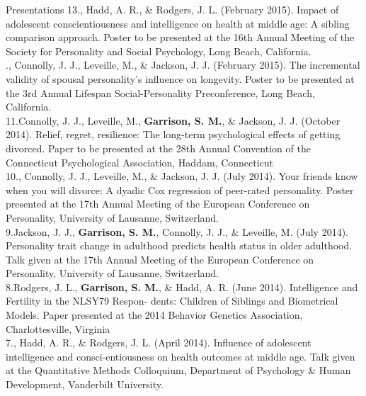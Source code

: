 \documentclass {resume}
\newcommand{\meb}{{\bf Garrison, S. M.}\xspace}
\begin{document}
\begin{rSection}{\textrm{Presentations}}
13.\hspace* {1mm}\meb, Hadd, A. R., \& Rodgers, J. L. (February 2015). Impact of adolescent conscientiousness and \hspace* {6 mm}intelligence on health at middle age: A sibling comparison approach. Poster to be presented at the 16th Annual \hspace* {6 mm}Meeting of the Society for Personality and  Social Psychology, Long Beach, California.\smallskip\\.\hspace* {1mm}\meb, Connolly, J. J., Leveille, M., \& Jackson, J. J. (February 2015). The incremental validity of \hspace* {6 mm}spousal personality's influence on longevity. Poster to be presented at the 3rd Annual Lifespan Social-Personality \hspace* {6 mm}Preconference, Long Beach, California.\smallskip\\
11.\hspace* {1mm}Connolly, J. J., Leveille, M., \meb, \& Jackson, J. J. (October 2014). Relief,  regret,  resilience: The  \hspace* {6 mm}long-term  psychological  effects  of  getting divorced. Paper to be presented at the 28th Annual Convention of the \hspace* {6 mm}Connecticut Psychological Association, Haddam, Connecticut%
\smallskip\\
10.\hspace* {1mm}\meb, Connolly, J. J., Leveille, M., \& Jackson, J. J. (July 2014). Your friends know when you will \hspace* {6 mm}divorce: A dyadic Cox regression of peer-rated personality. Poster presented at the 17th Annual Meeting of the \hspace* {6 mm}European Conference on Personality, University of Lausanne, Switzerland.
\smallskip\\
9.\hspace* {2.5mm}Jackson, J. J., \meb, Connolly, J. J., \& Leveille, M. (July 2014). Personality trait change in \hspace* {6 mm}adulthood predicts health status in older adulthood. Talk given at the 17th Annual Meeting of the European \hspace* {6 mm}Conference on Personality, University of Lausanne, Switzerland.
\smallskip\\
8.\hspace* {2.5mm}Rodgers, J. L., \meb, \& Hadd, A. R. (June 2014). Intelligence and Fertility in the NLSY79 Respon-
\hspace* {6 mm}dents: Children of Siblings and Biometrical Models. Paper presented at the 2014 Behavior Genetics Association, \hspace* {6 mm}Charlottesville, Virginia 
\smallskip\\
7.\hspace* {2.5 mm}\meb, Hadd, A. R., \& Rodgers, J. L. (April 2014). Influence of adolescent intelligence and consci-\hspace* {6 mm}entiousness on health outcomes at middle age. Talk given at the Quantitative Methods Colloquium, Department \hspace* {6 mm}of Psychology \& Human Development, Vanderbilt University. \smallskip\\

\end{rSection}
\end{document}
